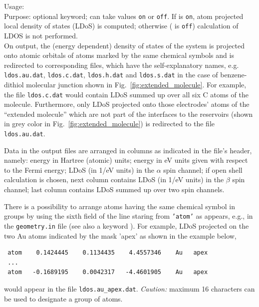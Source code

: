 
{
 \noindent 
 Usage: \quad {} \\[1.0ex] 
 Purpose: optional keyword;  can take values \texttt{on} or \texttt{off}. 
 If  is \texttt{on}, atom projected local density of states (LDoS) is computed; 
 otherwise ( is \texttt{off}) calculation of LDOS is not performed. \\
}
On output, the (energy dependent) density of states of the system is projected onto
atomic orbitals of atoms marked by the same chemical symbols and 
is redirected to corresponding files, which have the self-explanatory names, e.g.
\texttt{ldos.au.dat}, \texttt{ldos.c.dat}, \texttt{ldos.h.dat} and \texttt{ldos.s.dat} 
in the case of benzene-dithiol molecular junction shown in Fig.~\ref{fig:extended_molecule}.
For example, the file \texttt{ldos.c.dat} would contain LDoS summed up over all six C atoms of the molecule.
Furthermore, only LDoS projected onto those electrodes' atoms of the ``extended molecule'' which are not part of 
the interfaces to the reservoirs (shown in grey color in Fig.~\ref{fig:extended_molecule}) is 
redirected to the file \texttt{ldos.au.dat}. 
 
Data in the output files are arranged in columns as indicated
in the file's header, namely: energy in Hartree (atomic) units; 
energy in eV units given with respect to the Fermi energy; 
LDoS (in 1/eV units) in the $\alpha$ spin channel; 
if open shell calculation is chosen, next column contains LDoS (in 1/eV units) in the $\beta$ 
spin channel; last column contains LDoS summed up over two spin channels.

There is a possibility to arrange atoms having the same chemical symbol in groups
by using the sixth field of the line staring from \texttt{'atom'} as appears, e.g., 
in the \texttt{geometry.in} file (see also a keyword ). 
For example, LDoS projected on the two Au atoms indicated by 
the mask 'apex' as shown in the example below, 

\noindent
 \begin{verbatim}
 atom    0.1424445    0.1134435    4.4557346    Au   apex
 ...
 atom   -0.1689195    0.0042317   -4.4601905    Au   apex
 \end{verbatim}
 \noindent
 would appear in the file \texttt{ldos.au\_apex.dat}. \textit{Caution:} 
 maximum 16 characters can be used to designate a group of atoms.

